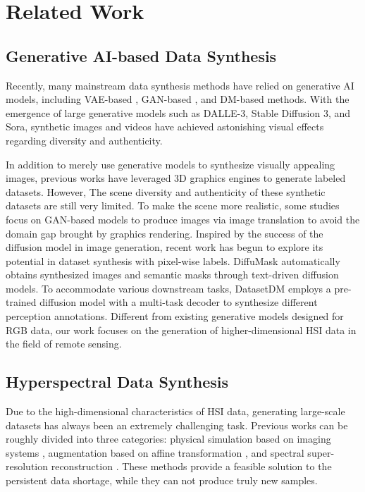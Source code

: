 \section{Related Work}
\label{sec:related work}

\subsection{Generative AI-based Data Synthesis}

Recently, many mainstream data synthesis methods have relied on generative AI models, including VAE-based \cite{shi2019variational,  Child2020VeryDV,vahdat2020nvae}, GAN-based \cite{Example-Guided, Controllable_Person, esser2021taming}, and DM-based \cite{kim2023dcface,zhang2023adding,li2024generative,ma2024latte} methods. With the emergence of large generative models such as DALLE-3, Stable Diffusion 3, and Sora, synthetic images and videos have achieved astonishing visual effects regarding diversity and authenticity.

In addition to merely use generative models to synthesize visually appealing images, previous works\cite{gaidon2016virtual,kar2019meta,devaranjan2020meta} have leveraged 3D graphics engines to generate labeled datasets. However, The scene diversity and authenticity of these synthetic datasets are still very limited. To make the scene more realistic, some studies \cite{datasetgan,bigdatasetgan} focus on GAN-based models to produce images via image translation to avoid the domain gap brought by graphics rendering. Inspired by the success of the diffusion model in image generation, recent work has begun to explore its potential in dataset synthesis with pixel-wise labels. DiffuMask \cite{diffumask} automatically obtains synthesized images and semantic masks through text-driven diffusion models. To accommodate various downstream tasks, DatasetDM \cite{datasetdm} employs a pre-trained diffusion model with a multi-task decoder to synthesize different perception annotations. Different from existing generative models designed for RGB data, our work focuses on the generation of higher-dimensional HSI data in the field of remote sensing.


\subsection{Hyperspectral Data Synthesis}
Due to the high-dimensional characteristics of HSI data, generating large-scale datasets has always been an extremely challenging task. Previous works can be roughly divided into three categories: physical simulation based on imaging systems \cite{physics,verrelst2015optical}, augmentation based on affine transformation \cite{affine,zhang2023features,wang2023multistage}, and spectral super-resolution reconstruction \cite{he2023spectral,cai2022mask,cai2022mst++}. These methods provide a feasible solution to the persistent data shortage, while they can not produce truly new samples. 

